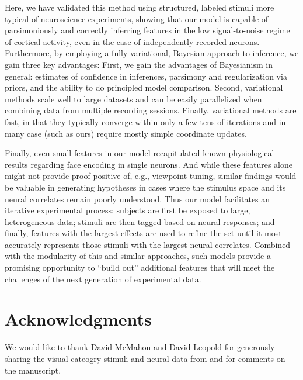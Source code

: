 \documentclass[12pt,a4paper]{article}
\begin{document}
Here, we have validated this method using structured, labeled stimuli more typical of neuroscience experiments, showing that our model is capable of parsimoniously and correctly inferring features in the low signal-to-noise regime of cortical activity, even in the case of independently recorded neurons. Furthermore, by employing a fully variational, Bayesian approach to inference, we gain three key advantages: First, we gain the advantages of Bayesianism in general: estimates of confidence in inferences, parsimony and regularization via priors, and the ability to do principled model comparison. Second, variational methods scale well to large datasets and can be easily parallelized when combining data from multiple recording sessions. Finally, variational methods are fast, in that they typically converge within only a few tens of iterations and in many case (such as ours) require mostly simple coordinate updates.

Finally, even small features in our model recapitulated known physiological results regarding face encoding in single neurons. And while these features alone might not provide proof positive of, e.g., viewpoint tuning, similar findings would be valuable in generating hypotheses in cases where the stimulus space and its neural correlates remain poorly understood. Thus our model facilitates an iterative experimental process: subjects are first be exposed to large, heterogeneous data; stimuli are then tagged based on neural responses; and finally, features with the largest effects are used to refine the set until it most accurately represents those stimuli with the largest neural correlates. Combined with the modularity of this and similar approaches, such models provide a promising opportunity to ``build out'' additional features that will meet the challenges of the next generation of experimental data.

\section*{Acknowledgments}
We would like to thank David McMahon and David Leopold for generously sharing the visual cateogry stimuli and neural data from \cite{McMahon2014-qq} and for comments on the manuscript.







\nolinenumbers

%
%
%

{}
\end{document}
